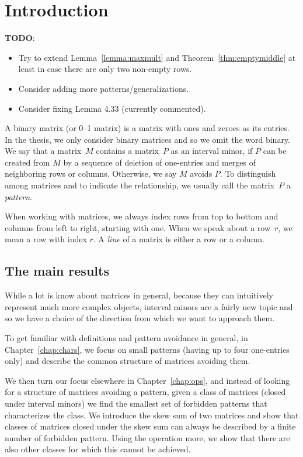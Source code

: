 \chapter{Introduction}
\textbf{TODO}:
\begin{itemize}
	\item Try to extend Lemma~\ref{lemma:maxmult} and Theorem~\ref{thm:emptymiddle} at least in case there are only two non-empty rows.
	\item Consider adding more patterns/generalizations.
	\item Consider fixing Lemma 4.33 (currently commented).
\end{itemize}

A binary matrix (or 0--1 matrix) is a matrix with ones and zeroes as its entries. In the thesis, we only consider binary matrices and so we omit the word binary. We say that a matrix~$M$ contains a matrix~$P$ as an interval minor, if $P$ can be created from $M$ by a sequence of deletion of one-entries and merges of neighboring rows or columns. Otherwise, we say $M$ avoids $P$. To distinguish among matrices and to indicate the relationship, we usually call the matrix~$P$ a \emph{pattern}.

When working with matrices, we always index rows from top to bottom and columns from left to right, starting with one. When we speak about a row~$r$, we mean a row with index $r$. A \emph{line} of a matrix is either a row or a column.

\section{The main results}
While a lot is know about matrices in general, because they can intuitively represent much more complex objects, interval minors are a fairly new topic and so we have a choice of the direction from which we want to approach them.

To get familiar with definitions and pattern avoidance in general, in Chapter~\ref{chap:chars}, we focus on small patterns (having up to four one-entries only) and describe the common structure of matrices avoiding them.

We then turn our focus elsewhere in Chapter~\ref{chap:ops}, and instead of looking for a structure of matrices avoiding a pattern, given a class of matrices (closed under interval minors) we find the smallest set of forbidden patterns that characterizes the class. We introduce the skew sum of two matrices and show that classes of matrices closed under the skew sum can always be described by a finite number of forbidden pattern. Using the operation more, we show that there are also other classes for which this cannot be achieved.

